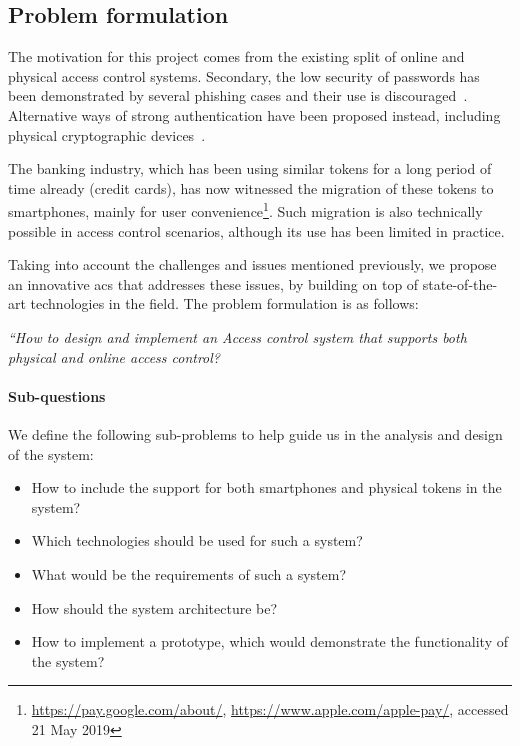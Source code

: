 \subsection{Problem formulation} \label{problemFormulation}
The motivation for this project comes from the existing split of online and physical access control systems. Secondary, the low security of passwords has been demonstrated by several phishing cases and their use is discouraged~\cite{Huang2011UsingAttacks, Paul2010OAuthAnti-pattern}. Alternative ways of strong authentication have been proposed instead, including physical cryptographic devices~\cite{FIDOFIDO2Project}.

The banking industry, which has been using similar tokens for a long period of time already (credit cards), has now witnessed the migration of these tokens to smartphones, mainly for user convenience\footnote{\url{https://pay.google.com/about/}, \url{https://www.apple.com/apple-pay/}, accessed 21 May 2019}. Such migration is also technically possible in access control scenarios, although its use has been limited in practice.

Taking into account the challenges and issues mentioned previously, we propose an innovative \acrshort{acs} that addresses these issues, by building on top of state-of-the-art technologies in the field. The problem formulation is as follows:

\begin{center}
    \textit{“How to design and implement an Access control system that supports both physical and online access control?}
\end{center}

\paragraph{Sub-questions}
We define the following sub-problems to help guide us in the analysis and design of the system:

\begin{itemize}[noitemsep]
    \item How to include the support for both smartphones and physical tokens in the system?
    \item Which technologies should be used for such a system?
    \item What would be the requirements of such a system?
    \item How should the system architecture be?
    \item How to implement a prototype, which would demonstrate the functionality of the system?
\end{itemize}